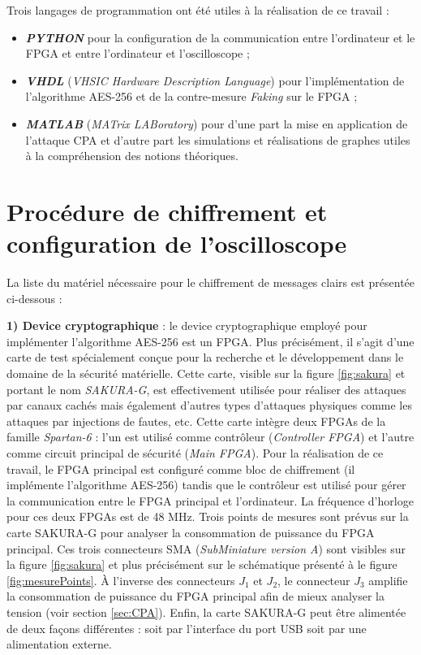 \documentclass[oneside]{book}
\begin{document}
\hspace{-0.5cm}Trois langages de programmation ont été utiles à la réalisation de ce travail : 
\begin{itemize}
\item \textbf{\textit{PYTHON}} pour la configuration de la communication entre l'ordinateur et le FPGA et entre l'ordinateur et l'oscilloscope ;
\item \textbf{\textit{VHDL}} (\textit{VHSIC Hardware Description Language}) pour l'implémentation de l'algorithme AES-256 et de la contre-mesure \textit{Faking} sur le FPGA ;
\item \textbf{\textit{MATLAB}} (\textit{MATrix LABoratory}) pour d'une part la mise en application de l'attaque CPA et d'autre part les simulations et réalisations de graphes utiles à la compréhension des notions théoriques. \\
\end{itemize}


\section{Procédure de chiffrement et configuration de l'oscilloscope}
\label{sec:config_chiff}

\hspace{-0.5cm}La liste du matériel nécessaire pour le chiffrement de messages clairs est présentée ci-dessous : 

\hspace{-0.5cm}\textbf{1) Device cryptographique} : le device cryptographique employé pour implémenter l'algorithme AES-256 est un FPGA. Plus précisément, il s'agit d'une carte de test spécialement conçue pour la recherche et le développement dans le domaine de la sécurité matérielle. Cette carte, visible sur la figure \ref{fig:sakura} et portant le nom \textit{SAKURA-G}, est effectivement utilisée pour réaliser des attaques par canaux cachés mais également d'autres types d'attaques physiques comme les attaques par injections de fautes, etc. Cette carte intègre deux FPGAs de la famille \textit{Spartan-6} : l'un est utilisé comme contrôleur (\textit{Controller FPGA}) et l'autre comme circuit principal de sécurité (\textit{Main FPGA}). Pour la réalisation de ce travail, le FPGA principal est configuré comme bloc de chiffrement (il implémente l'algorithme AES-256) tandis que le contrôleur est utilisé pour gérer la communication entre le FPGA principal et l'ordinateur. La fréquence d'horloge pour ces deux FPGAs est de 48 MHz. Trois points de mesures sont prévus sur la carte SAKURA-G pour analyser la consommation de puissance du FPGA principal. Ces trois connecteurs SMA (\textit{SubMiniature version A}) sont visibles sur la figure \ref{fig:sakura} et plus précisément sur le schématique présenté à le figure \ref{fig:mesurePoints}. À l'inverse des connecteurs $J_1$ et $J_2$, le connecteur $J_3$ amplifie la consommation de puissance du FPGA principal afin de mieux analyser la tension (voir section \ref{sec:CPA}). Enfin, la carte SAKURA-G peut être alimentée de deux façons différentes : soit par l'interface du port USB soit par une alimentation externe.
\end{document}
